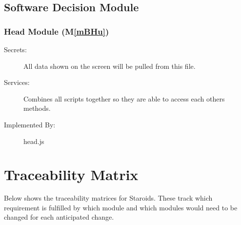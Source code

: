 \documentclass[12pt, titlepage]{article}
\newcommand{\mref}[1]{M\ref{#1}}
\begin{document}
\subsection{Software Decision Module}


\subsubsection{Head Module (\mref{mBHu})}
\begin{description}
\item[Secrets:]All data shown on the screen will be pulled from this file.
\item[Services:] Combines all scripts together so they are able to access each others methods.
\item[Implemented By:] head.js
\end{description}


\section{Traceability Matrix} \label{SecTM}

Below shows the traceability matrices for Staroids. These track which requirement is fulfilled by which module and which modules would need to be changed for each anticipated change.
\end{document}
